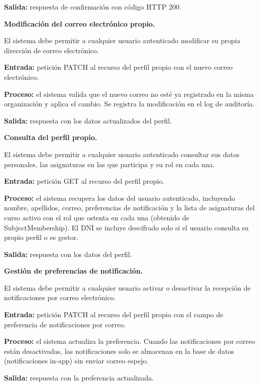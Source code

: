 \begin{functional}
\begin{functional}
    \textbf{Salida:} respuesta de confirmación con código HTTP 200.

    \item \textbf{Modificación del correo electrónico propio.}

    El sistema debe permitir a cualquier usuario autenticado modificar su propia dirección de correo electrónico.

    \textbf{Entrada:} petición PATCH al recurso del perfil propio con el nuevo correo electrónico.

    \textbf{Proceso:} el sistema valida que el nuevo correo no esté ya registrado en la misma organización y aplica el cambio. Se registra la modificación en el log de auditoría.

    \textbf{Salida:} respuesta con los datos actualizados del perfil.

    \item \textbf{Consulta del perfil propio.}

    El sistema debe permitir a cualquier usuario autenticado consultar sus datos personales, las asignaturas en las que participa y su rol en cada una.

    \textbf{Entrada:} petición GET al recurso del perfil propio.

    \textbf{Proceso:} el sistema recupera los datos del usuario autenticado, incluyendo nombre, apellidos, correo, preferencias de notificación y la lista de asignaturas del curso activo con el rol que ostenta en cada una (obtenido de SubjectMembership). El DNI se incluye descifrado solo si el usuario consulta su propio perfil o es gestor.

    \textbf{Salida:} respuesta con los datos del perfil.

    \item \textbf{Gestión de preferencias de notificación.}

    El sistema debe permitir a cualquier usuario activar o desactivar la recepción de notificaciones por correo electrónico.

    \textbf{Entrada:} petición PATCH al recurso del perfil propio con el campo de preferencia de notificaciones por correo.

    \textbf{Proceso:} el sistema actualiza la preferencia. Cuando las notificaciones por correo están desactivadas, las notificaciones solo se almacenan en la base de datos (notificaciones in-app) sin enviar correo espejo.

    \textbf{Salida:} respuesta con la preferencia actualizada.


\end{functional}
\end{functional}
